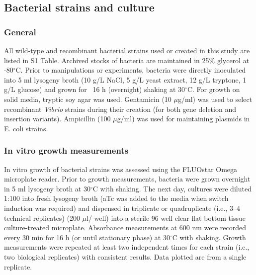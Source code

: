 \subsection{Bacterial strains and culture}

\subsubsection{General}
All wild-type and recombinant bacterial strains used or created in this study are listed in S1 Table. Archived stocks of bacteria are maintained in 25\% glycerol at -80$^\circ$C. Prior to manipulations or experiments, bacteria were directly inoculated into 5 ml lysogeny broth (10 g/L NaCl, 5 g/L yeast extract, 12 g/L tryptone, 1 g/L glucose) and grown for ~16 h (overnight) shaking at 30$^\circ$C. For growth on solid media, tryptic soy agar was used. Gentamicin (10 $\mu$g/ml) was used to select recombinant \textit{Vibrio} strains during their creation (for both gene deletion and insertion variants). Ampicillin (100 $\mu$g/ml) was used for maintaining plasmids in E. coli strains. 

\subsubsection{In vitro growth measurements}
In vitro growth of bacterial strains was assessed using the FLUOstar Omega microplate reader. Prior to growth measurements, bacteria were grown overnight in 5 ml lysogeny broth at 30$^\circ$C with shaking. The next day, cultures were diluted 1:100 into fresh lysogeny broth (aTc was added to the media when switch induction was required) and dispensed in triplicate or quadruplicate (i.e., 3–4 technical replicates) (200 $\mu$l/ well) into a sterile 96 well clear flat bottom tissue culture-treated microplate. Absorbance measurements at 600 nm were recorded every 30 min for 16 h (or until stationary phase) at 30$^\circ$C with shaking. Growth measurements were repeated at least two independent times for each strain (i.e., two biological replicates) with consistent results. Data plotted are from a single replicate.

